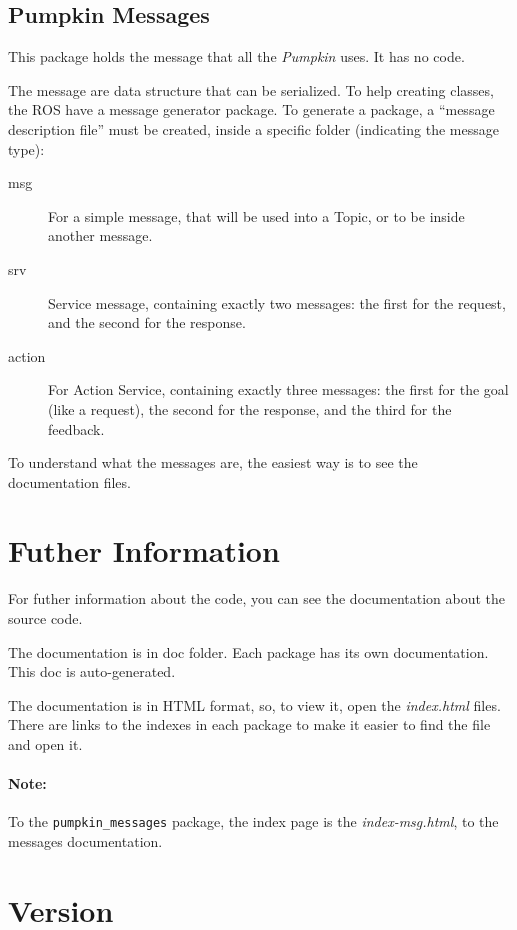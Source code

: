\documentclass[oneside,a4paper,titlepage]{article}
\begin{document}
\subsection{Pumpkin Messages}

This package holds the message that all the \emph{Pumpkin} uses. It has no code.

The message are data structure that can be serialized. To help creating classes, the ROS have a message generator package. To generate a package, a ``message description file'' must be created, inside a specific folder (indicating the message type):

\begin{description}
	\item[msg] For a simple message, that will be used into a Topic, or to be inside another message.
	\item[srv] Service message, containing exactly two messages: the first for the request, and the second for the response.
	\item[action] For Action Service, containing exactly three messages: the first for the goal (like a request), the second for the response, and the third for the feedback.
\end{description}

To understand what the messages are, the easiest way is to see the documentation files.

\newpage
\section{Futher Information}

For futher information about the code, you can see the documentation about the source code.

The documentation is in doc folder. Each package has its own documentation. This doc is auto-generated.

The documentation is in HTML format, so, to view it, open the \emph{index.html} files. There are links to the indexes in each package to make it easier to find the file and open it.

\paragraph{Note: } To the \texttt{pumpkin\_messages} package, the index page is the \emph{index-msg.html}, to the messages documentation.

\appendix

\section{Version}
\end{document}
